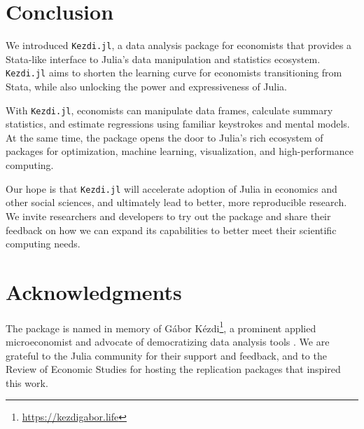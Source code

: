 \documentclass{juliacon}
\begin{document}
\section{Conclusion}

We introduced \texttt{Kezdi.jl}, a data analysis package for economists that provides a Stata-like interface to Julia's data manipulation and statistics ecosystem. \texttt{Kezdi.jl} aims to shorten the learning curve for economists transitioning from Stata, while also unlocking the power and expressiveness of Julia.

With \texttt{Kezdi.jl}, economists can manipulate data frames, calculate summary statistics, and estimate regressions using familiar keystrokes and mental models. At the same time, the package opens the door to Julia's rich ecosystem of packages for optimization, machine learning, visualization, and high-performance computing.

Our hope is that \texttt{Kezdi.jl} will accelerate adoption of Julia in economics and other social sciences, and ultimately lead to better, more reproducible research. We invite researchers and developers to try out the package and share their feedback on how we can expand its capabilities to better meet their scientific computing needs.

\section*{Acknowledgments}

The package is named in memory of Gábor Kézdi\footnote{\url{https://kezdigabor.life}}, a prominent applied microeconomist and advocate of democratizing data analysis tools \cite{gabors-data}. We are grateful to the Julia community for their support and feedback, and to the Review of Economic Studies for hosting the replication packages that inspired this work.


\end{document}
